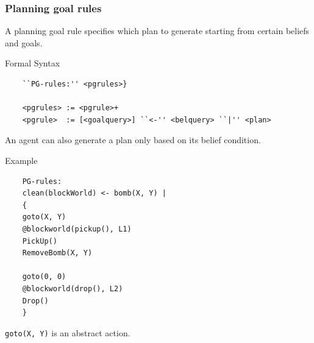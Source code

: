 \documentclass[dvipsnames,usenames,10pt]{beamer}
\newcommand{\bsyntax}{\begin{beamerboxesrounded}[upper=synupcol,lower=synlowcol,shadow=true]{Formal Syntax}}
\newcommand{\esyntax}{\end{beamerboxesrounded}}
\newcommand{\bexample}{\begin{beamerboxesrounded}[upper=exupcol,lower=exlowcol,shadow=true]{Example}}
\newcommand{\eexample}{\end{beamerboxesrounded}}
\begin{document}
\begin{frame}
	\frametitle{Planning goal rules}

	A planning goal rule specifies which plan to generate starting from certain beliefs and goals.

	\bsyntax
	\begin{verbatim}
	``PG-rules:'' <pgrules>}
	
	<pgrules> := <pgrule>+
	<pgrule>  := [<goalquery>] ``<-'' <belquery> ``|'' <plan>
	\end{verbatim}
	\esyntax

	An agent can also generate a plan only based on its belief condition.

	\break

	\bexample 
	\begin{verbatim}
	PG-rules:
	clean(blockWorld) <- bomb(X, Y) |
  	{ 
	goto(X, Y)
	@blockworld(pickup(), L1)
	PickUp()
	RemoveBomb(X, Y)

	goto(0, 0)
	@blockworld(drop(), L2)
	Drop()
	}
	\end{verbatim}
	\eexample

	\texttt{goto(X, Y)} is an abstract action.

\end{frame}
\end{document}
